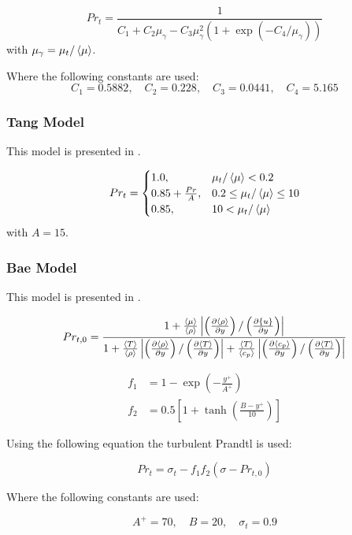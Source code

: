 \begin{equation}
Pr_{t} = \frac{1}{C_1+C_2\mu_\gamma-C_3\mu_\gamma^2(1+\exp(-C_4/\mu_\gamma))}
\end{equation}
with $\mu_\gamma = \mu_t/\left<{\mu}\right>$.

Where the following constants are used:
\begin{equation}
C_1=0.5882, \quad C_2=0.228, \quad C_3=0.0441, \quad C_4=5.165
\end{equation}




\subsubsection{Tang Model}

This model is presented in \cite{TANG20161082}.

\begin{equation}
  Pr_{t} =
    \begin{cases}
      1.0, & \mu_t/\left<{\mu}\right> < 0.2 \\
      0.85 + \frac{Pr}{A}, & 0.2 \leq \mu_t/\left<{\mu}\right> \leq 10\\
      0.85, & 10 < \mu_t/\left<{\mu}\right>
    \end{cases}       
\end{equation}
with $A=15$.





\subsubsection{Bae Model}
This model is presented in \cite{bae2016new}.

\begin{equation}
Pr_{t,0} = \frac{1+\frac{\left<{\mu}\right>}{\left<{\rho}\right>}\left|\left(\frac{\partial \left<{\rho}\right>}{\partial {y}}\right)/\left(\frac{\partial \{{u}\}}{\partial {y}}\right)\right|}{1+\frac{\left<{T}\right>}{\left<{\rho}\right>}\left|\left(\frac{\partial \left<{\rho}\right>}{\partial {y}}\right)/\left(\frac{\partial \left<{T}\right>}{\partial {y}}\right)\right|+\frac{\left<{T}\right>}{\left<{c_p}\right>}\left|\left(\frac{\partial \left<{c_p}\right>}{\partial {y}}\right)/\left(\frac{\partial \left<{T}\right>}{\partial {y}}\right)\right|}
\end{equation}


\begin{equation}
\begin{split}
    f_1 &= 1-\exp\left(-\frac{y^+}{A^+}\right) \\
    f_2 &= 0.5\left[1+\tanh\left(\frac{B-y^+}{10}\right)\right]
\end{split}    
\end{equation}

Using the following equation the turbulent Prandtl is used:

\begin{equation} 
Pr_t = \sigma_t - f_1f_2(\sigma-Pr_{t,0})
\end{equation}

Where the following constants are used:

\begin{equation}
A^+ =70, \quad B=20, \quad \sigma_t=0.9
\end{equation}


